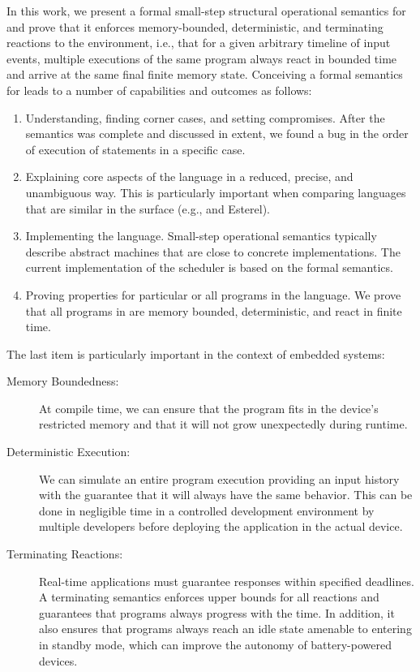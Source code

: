 In this work, we present a formal small-step structural operational
semantics for \CEU and prove that it enforces memory-bounded, deterministic,
and terminating reactions to the environment, i.e., that for a given
arbitrary timeline of input events, multiple executions of the same program
always react in bounded time and arrive at the same final finite memory
state.
%
Conceiving a formal semantics for \CEU leads to a number of capabilities and
outcomes as follows:

\begin{enumerate}
\item
    Understanding, finding corner cases, and setting compromises.
    After the semantics was complete and discussed in extent, we found a bug in
    the order of execution of statements in a specific case.
\item
    Explaining core aspects of the language in a reduced, precise, and
    unambiguous way.
    This is particularly important when comparing languages that are similar in
    the surface (e.g., \CEU and Esterel).
\item
    Implementing the language.
    Small-step operational semantics typically describe abstract machines that
    are close to concrete implementations.
    The current implementation of the \CEU scheduler is based on the formal
    semantics.
\item
    Proving properties for particular or all programs in the language.
    We prove that all programs in \CEU are memory bounded, deterministic, and
    react in finite time.
\end{enumerate}

The last item is particularly important in the context of embedded systems:

\begin{description}
\item[Memory Boundedness:]
At compile time, we can ensure that the program fits in the device's restricted
memory and that it will not grow unexpectedly during runtime.
\item[Deterministic Execution:]
We can simulate an entire program execution providing an input history with the
guarantee that it will always have the same behavior.
This can be done in negligible time in a controlled development environment by
multiple developers before deploying the application in the actual device.
\item[Terminating Reactions:]
Real-time applications must guarantee responses within specified deadlines.
A terminating semantics enforces upper bounds for all reactions and guarantees
that programs always progress with the time.
In addition, it also ensures that programs always reach an idle state amenable
to entering in standby mode, which can improve the autonomy of battery-powered
devices.
\end{description}
